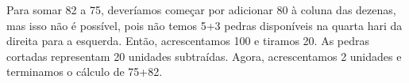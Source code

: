\documentclass[12pt]{book}
\begin{document}
\begin{minipage}{0.4\textwidth}
\end{minipage}%
%
\begin{minipage}{0.5\textwidth}
\end{minipage}

Para somar 82 a 75, deveríamos
começar por adicionar 80 à coluna das dezenas,
mas isso não é possível,
pois não temos 5+3 pedras disponíveis
na quarta hari da direita para a esquerda.
Então, acrescentamos
100 e tiramos 20. As pedras cortadas
representam 20 unidades subtraídas.
Agora, acrescentamos 2 unidades e
terminamos o cálculo de 75+82.\\
\end{document}
